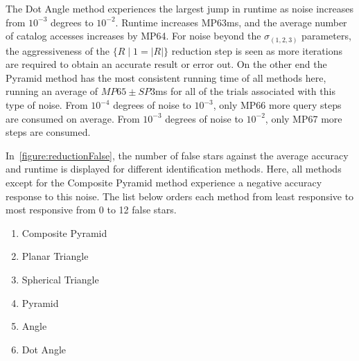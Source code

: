 The Dot Angle method experiences the largest jump in runtime as noise increases from $10^{-3}$ degrees to $10^{-2}$.
Runtime increases MP63ms, and the average number of catalog accesses increases by MP64.
For noise beyond the $\sigma_{(1, 2, 3)}$ parameters, the aggressiveness of the $\{ R \mid 1 = |R| \}$ reduction step
is seen as more iterations are required to obtain an accurate result or error out.
On the other end the Pyramid method has the most consistent running time of all methods here, running an average of
$MP65 \pm SP3$ms for all of the trials associated with this type of noise.
From $10^{-4}$ degrees of noise to $10^{-3}$, only MP66 more query steps are consumed on average.
From $10^{-3}$ degrees of noise to $10^{-2}$, only MP67 more steps are consumed.

\begin{figure}
\end{figure}

In~\autoref{figure:reductionFalse}, the number of false stars against the average accuracy and runtime is displayed
for different identification methods.
Here, all methods except for the Composite Pyramid method experience a negative accuracy response to this noise.
The list below orders each method from least responsive to most responsive from 0 to 12 false stars.
\begin{multicols}{2}
    \begin{enumerate}
        \item Composite Pyramid
        \item Planar Triangle
        \item Spherical Triangle
        \item Pyramid
        \item Angle
        \item Dot Angle
    \end{enumerate}
\end{multicols}

